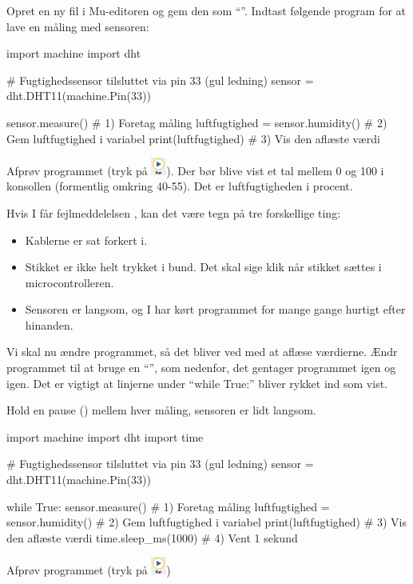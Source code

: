 \documentclass{ucph-handout}
\begin{document}
\begin{exercisebox}[adjusted title=Måling]
  Opret en ny fil i Mu-editoren og gem den som "`"'.
  Indtast følgende program for at lave en måling med sensoren:

\begin{python}
import machine
import dht

# Fugtighedssensor tilsluttet via pin 33 (gul ledning)
sensor = dht.DHT11(machine.Pin(33))

sensor.measure()                  # 1) Foretag måling
luftfugtighed = sensor.humidity() # 2) Gem luftfugtighed i variabel
print(luftfugtighed)              # 3) Vis den aflæste værdi
\end{python}

Afprøv programmet (tryk på
\includegraphics[width=5mm]{illustrationer/run-button}). Der bør blive
vist et tal mellem 0 og 100 i konsollen (formentlig omkring
40-55). Det er luftfugtigheden i procent.

Hvis I får fejlmeddelelsen , kan det være tegn på tre forskellige ting:
\begin{itemize}
\item Kablerne er sat forkert i.
\item Stikket er ikke helt trykket i bund. Det skal sige klik når stikket sættes i microcontrolleren.
\item Sensoren er langsom, og I har kørt programmet for mange gange hurtigt efter hinanden.
\end{itemize}
\end{exercisebox}
\newpage
\begin{exercisebox}[adjusted title=Gentag måling]
Vi skal nu ændre programmet, så det bliver ved med at aflæse værdierne. Ændr
programmet til at bruge en "`"', som nedenfor, det
gentager programmet igen og igen. Det er vigtigt at linjerne under
"`while True:"' bliver rykket ind som vist.\\
\vspace{-2mm}

Hold en pause () mellem hver måling, sensoren er lidt langsom.

\begin{python}
import machine
import dht
import time

# Fugtighedssensor tilsluttet via pin 33 (gul ledning)
sensor = dht.DHT11(machine.Pin(33))

while True:
    sensor.measure()                  # 1) Foretag måling
    luftfugtighed = sensor.humidity() # 2) Gem luftfugtighed i variabel
    print(luftfugtighed)              # 3) Vis den aflæste værdi
    time.sleep_ms(1000)               # 4) Vent 1 sekund
\end{python}

Afprøv programmet (tryk på \includegraphics[width=5mm]{illustrationer/run-button})
\end{exercisebox}
\end{document}
